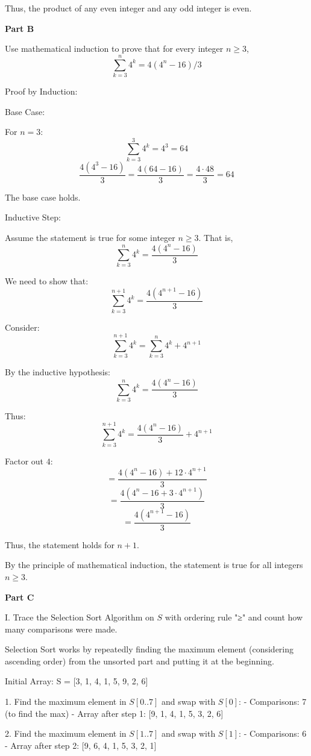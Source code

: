\documentclass{article}
\begin{document}
	Thus, the product of any even integer and any odd integer is even.
	
	\textbf{Part B}
	
	Use mathematical induction to prove that for every integer \( n \geq 3 \),
	\[ \sum_{k=3}^{n} 4^k = 4(4^n - 16)/3 \]
	
	Proof by Induction:
	
	Base Case:
	
	For \( n = 3 \):
	\[ \sum_{k=3}^{3} 4^k = 4^3 = 64 \]
	\[ \frac{4(4^3 - 16)}{3} = \frac{4(64 - 16)}{3} = \frac{4 \cdot 48}{3} = 64 \]
	
	The base case holds.
	
	Inductive Step:
	
	Assume the statement is true for some integer \( n \geq 3 \). That is,
	\[ \sum_{k=3}^{n} 4^k = \frac{4(4^n - 16)}{3} \]
	
	We need to show that:
	\[ \sum_{k=3}^{n+1} 4^k = \frac{4(4^{n+1} - 16)}{3} \]
	
	Consider:
	\[ \sum_{k=3}^{n+1} 4^k = \sum_{k=3}^{n} 4^k + 4^{n+1} \]
	
	By the inductive hypothesis:
	\[ \sum_{k=3}^{n} 4^k = \frac{4(4^n - 16)}{3} \]
	
	Thus:
	\[ \sum_{k=3}^{n+1} 4^k = \frac{4(4^n - 16)}{3} + 4^{n+1} \]
	
	Factor out \( 4 \):
	\[ = \frac{4(4^n - 16) + 12 \cdot 4^{n+1}}{3} \]
	\[ = \frac{4(4^n - 16 + 3 \cdot 4^{n+1})}{3} \]
	\[ = \frac{4(4^{n+1} - 16)}{3} \]
	
	Thus, the statement holds for \( n+1 \).
	
	By the principle of mathematical induction, the statement is true for all integers \( n \geq 3 \).
	
	\textbf{Part C}	
	
	I. Trace the Selection Sort Algorithm on \( S \) with ordering rule "≥" and count how many comparisons were made.
	
	Selection Sort works by repeatedly finding the maximum element (considering ascending order) from the unsorted part and putting it at the beginning.
	
	Initial Array: S = [3, 1, 4, 1, 5, 9, 2, 6]
	
	1. Find the maximum element in \( S[0..7] \) and swap with \( S[0] \):
	- Comparisons: 7 (to find the max)
	- Array after step 1: [9, 1, 4, 1, 5, 3, 2, 6]
	
	2. Find the maximum element in \( S[1..7] \) and swap with \( S[1] \):
	- Comparisons: 6
	- Array after step 2: [9, 6, 4, 1, 5, 3, 2, 1]
	
\end{document}
